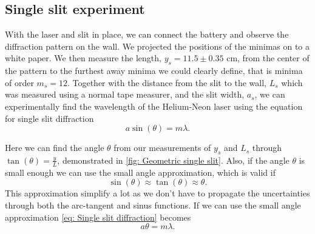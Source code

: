 \documentclass{emulateapj}
\begin{document}
\subsection{Single slit experiment}
\label{subsec: Method Single slit}
With the laser and slit in place, we can connect the battery and observe the diffraction pattern on the wall. We projected the positions of the minimas on to a white paper. We then measure the length, $y_s = 11.5 \pm 0.35$ cm, from the center of the pattern to the furthest away minima we could clearly define, that is minima of order $m_s=12$. Together with the distance from the slit to the wall, $L_s$ which was measured using a normal tape measurer, and the slit width, $a_s$, we can experimentally find the wavelength of the Helium-Neon laser using the equation for single slit diffraction
\begin{equation}
a\sin(\theta) = m\lambda.
\label{eq: Single slit diffraction}
\end{equation}

Here we can find the angle $\theta$ from our measurements of $y_s$ and $L_s$ through $\tan(\theta) = \frac{y}{L}$, demonstrated in \cref{fig: Geometric single slit}. Also, if the angle $\theta$ is small enough we can use the small angle approximation, which is valid if 
\begin{equation}
\sin(\theta) \approx \tan(\theta) \approx \theta.
\label{eq: Small angle approximation}
\end{equation}
This approximation simplify a lot as we don't have to propagate the uncertainties through both the arc-tangent and sinus functions. If we can use the small angle approximation \cref{eq: Single slit diffraction} becomes
\begin{equation}
a\theta = m\lambda.
\label{eq: approx single slit diffraction}
\end{equation}
\end{document}

